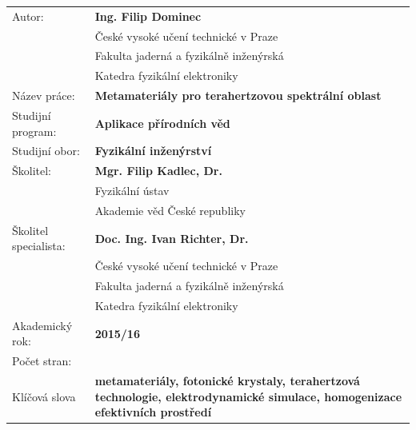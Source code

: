 \bgroup {}
\noindent\begin{tabular}{p{.25\linewidth}p{.7\linewidth}}
	Autor:				&\textbf{Ing. Filip Dominec} \\ 
					~	&České vysoké učení technické v Praze\\ 
					~	&Fakulta jaderná a fyzikálně inženýrská\\  
					~	&Katedra fyzikální elektroniky\\
Název práce:			&\textbf{Metamateriály pro terahertzovou spektrální oblast} \\
Studijní program:		&\textbf{Aplikace přírodních věd} \\
Studijní obor:			&\textbf{Fyzikální inženýrství} \\
Školitel:				&\textbf{Mgr. Filip Kadlec, Dr.} \\
					~	&Fyzikální ústav\\ 
					~	&Akademie věd České republiky\\  %
Školitel specialista:	&\textbf{Doc. Ing. Ivan Richter, Dr.} \\
					~	&České vysoké učení technické v Praze\\ 
					~	&Fakulta jaderná a fyzikálně inženýrská\\  
					~	&Katedra fyzikální elektroniky\\
Akademický rok:			&\textbf{2015/16} \\			%
Počet stran:			&\textbf{\pageref{enddocument}} \\  %
Klíčová slova			&\textbf{metamateriály, fotonické krystaly, terahertzová technologie, elektrodynamické simulace, homogenizace efektivních prostředí} \\
\end{tabular}
\egroup

\thispagestyle{empty} \newpage

